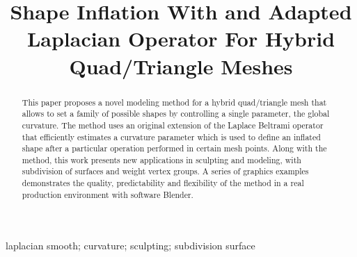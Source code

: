 \documentclass[10pt, conference]{IEEEtran}
\begin{document}
\title{Shape Inflation With and Adapted Laplacian Operator For Hybrid Quad/Triangle Meshes}

\newif\iffinal
\finaltrue
\newcommand{\jemsid}{114677}

\iffinal
  \author{%
  }
\else
  \author{Sibgrapi paper ID: \jemsid \\ }
\fi


\maketitle

\begin{abstract}
This paper proposes a novel modeling method for a hybrid quad/triangle
mesh that allows to set a family of possible shapes by controlling
a single parameter, the global curvature. The method uses an original
extension of the Laplace Beltrami operator that efficiently estimates
a curvature parameter which is used to define an inflated shape after
a particular operation performed in certain mesh points. Along with
the method, this work presents new applications in sculpting and modeling,
with subdivision of surfaces and weight vertex groups. A series of
graphics examples demonstrates the quality, predictability and flexibility
of the method in a real production environment with software Blender.

\end{abstract}

\begin{IEEEkeywords}
laplacian smooth; curvature; sculpting; subdivision surface

\end{IEEEkeywords}
\end{document}
